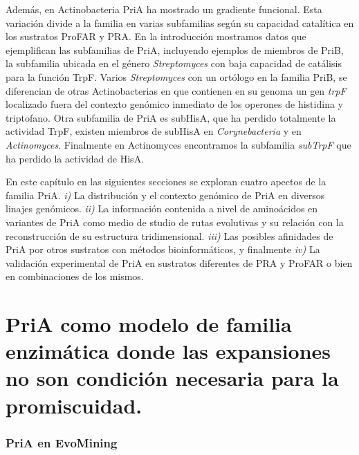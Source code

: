 \documentclass[12pt,twoside]{reedthesis}
\begin{document}
  Además, en Actinobacteria PriA ha mostrado un gradiente funcional. Esta
  variación divide a la familia en varias subfamilias según su capacidad
  catalítica en los sustratos ProFAR y PRA. En la introducción mostramos
  datos que ejemplifican las subfamilias de PriA, incluyendo ejemplos de
  miembros de PriB, la subfamilia ubicada en el género \emph{Streptomyces}
  con baja capacidad de catálisis para la función TrpF. Varios
  \emph{Streptomyces} con un ortólogo en la familia PriB, se diferencian
  de otras Actinobacterias en que contienen en su genoma un gen
  \emph{trpF} localizado fuera del contexto genómico inmediato de los
  operones de histidina y triptofano. Otra subfamilia de PriA es subHisA,
  que ha perdido totalmente la actividad TrpF, existen miembros de subHisA
  en \emph{Corynebacteria} y en \emph{Actinomyces}. Finalmente en
  Actinomyces encontramos la subfamilia \emph{subTrpF} que ha perdido la
  actividad de HisA.
  
  En este capítulo en las siguientes secciones se exploran cuatro apectos
  de la familia PriA. \emph{i)} La distribución y el contexto genómico de
  PriA en diversos linajes genómicos. \emph{ii)} La información contenida
  a nivel de aminoácidos en variantes de PriA como medio de studio de
  rutas evolutivas y su relación con la reconstrucción de su estructura
  tridimensional. \emph{iii)} Las posibles afinidades de PriA por otros
  sustratos con métodos bioinformáticos, y finalmente \emph{iv)} La
  validación experimental de PriA en sustratos diferentes de PRA y ProFAR
  o bien en combinaciones de los mismos.
  
  \section{PriA como modelo de familia enzimática donde las expansiones no
  son condición necesaria para la
  promiscuidad.}\label{pria-como-modelo-de-familia-enzimatica-donde-las-expansiones-no-son-condicion-necesaria-para-la-promiscuidad.}
  
  \subsubsection{PriA en EvoMining}\label{pria-en-evomining}
  
\end{document}
